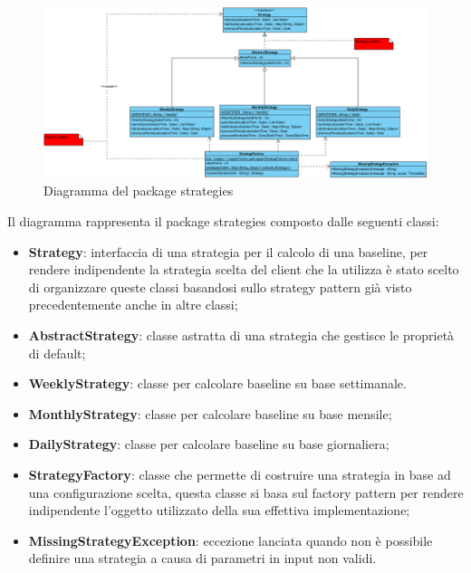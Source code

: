         \begin{figure}[htbp]
            \centering
            \includegraphics[width=\textwidth]{./img/DiagrammiClasse/Strategies.png}
            \caption[Diagramma del package strategies]{Diagramma del package strategies}
        \end{figure}
        Il diagramma rappresenta il package strategies composto dalle seguenti classi:
        \begin{itemize}
        	\item \textbf{Strategy}: interfaccia di una strategia per il calcolo di una baseline,
        		per rendere indipendente la strategia scelta del client che la utilizza è stato scelto
        		di organizzare queste classi basandosi sullo strategy pattern già visto precedentemente
        		anche in altre classi;
        	\item \textbf{AbstractStrategy}: classe astratta di una strategia che gestisce le proprietà di default;
        	\item \textbf{WeeklyStrategy}: classe per calcolare baseline su base settimanale.
        	\item \textbf{MonthlyStrategy}: classe per calcolare baseline su base mensile;
        	\item \textbf{DailyStrategy}: classe per calcolare baseline su base giornaliera;
        	\item \textbf{StrategyFactory}: classe che permette di costruire una strategia in base ad 
        		una configurazione scelta, questa classe si basa sul factory pattern per rendere indipendente 
        		l'oggetto utilizzato della sua effettiva implementazione; 
        	\item \textbf{MissingStrategyException}: eccezione lanciata quando non è possibile definire una 
        		strategia a causa di parametri in input non validi.
        \end{itemize}


